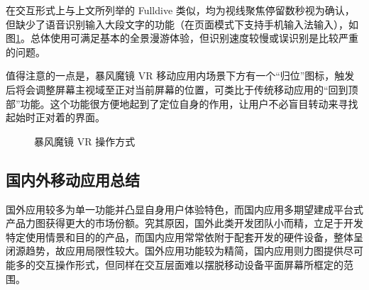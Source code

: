 在交互形式上与上文所列举的 Fulldive 类似，均为视线聚焦停留数秒视为确认，但缺少了语音识别输入大段文字的功能（在页面模式下支持手机输入法输入），如图\ref{fig:storm}。总体使用可满足基本的全景漫游体验，但识别速度较慢或误识别是比较严重的问题。

值得注意的一点是，暴风魔镜 VR 移动应用内场景下方有一个“归位”图标，触发后将会调整屏幕主视域至正对当前屏幕的位置，可类比于传统移动应用的“回到顶部”功能。这个功能很方便地起到了定位自身的作用，让用户不必盲目转动来寻找起始时正对着的界面。


\begin{figure}[htp]
\centering
{}
\caption{暴风魔镜 VR 操作方式}
\label{fig:storm}
\end{figure}

\subsection{国内外移动应用总结}
国外应用较多为单一功能并凸显自身用户体验特色，而国内应用多期望建成平台式产品力图获得更大的市场份额。究其原因，国外此类开发团队小而精，立足于开发特定使用情景和目的的产品，而国内应用常常依附于配套开发的硬件设备，整体呈闭源趋势，故应用局限性较大。国外应用功能较为精简，国内应用则力图提供尽可能多的交互操作形式，但同样在交互层面难以摆脱移动设备平面屏幕所框定的范围。
